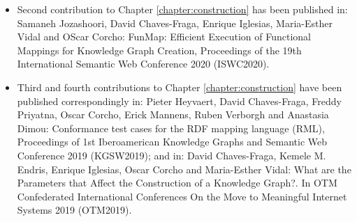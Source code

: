 \begin{itemize}
    \item Second contribution to Chapter \ref{chapter:construction} has been published in: Samaneh Jozashoori, David Chaves-Fraga, Enrique Iglesias, Maria-Esther Vidal and OScar Corcho: FunMap: Efficient Execution of Functional Mappings for Knowledge Graph Creation, Proceedings of the 19th International Semantic Web Conference 2020 (ISWC2020).
    \item Third and fourth contributions to Chapter \ref{chapter:construction} have been  published correspondingly in: Pieter Heyvaert, David Chaves-Fraga, Freddy Priyatna, Oscar Corcho, Erick Mannens, Ruben Verborgh and Anastasia Dimou: Conformance test cases for the RDF mapping language (RML), Proceedings of 1st Iberoamerican Knowledge Graphs and Semantic Web Conference 2019 (KGSW2019); and in: David Chaves-Fraga, Kemele M. Endris, Enrique Iglesias, Oscar Corcho and Maria-Esther Vidal: What are the Parameters that Affect the Construction of a Knowledge Graph?. In OTM Confederated International Conferences On the Move to Meaningful Internet Systems 2019 (OTM2019).
\end{itemize}



